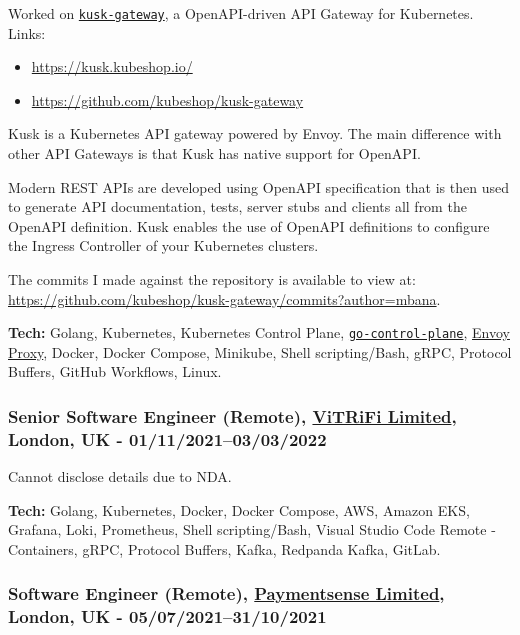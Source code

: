 \documentclass[
  a4paper,
  8pt,
]{article}
\providecommand{\tightlist}{%
  \setlength{\itemsep}{0pt}\setlength{\parskip}{0pt}}
\begin{document}
\begin{multicols}{2}
Worked on \href{https://docs.kusk.io/}{\texttt{kusk-gateway}}, a
OpenAPI-driven API Gateway for Kubernetes. Links:

\begin{itemize}
\tightlist
\item
  \url{https://kusk.kubeshop.io/}
\item
  \url{https://github.com/kubeshop/kusk-gateway}
\end{itemize}

Kusk is a Kubernetes API gateway powered by Envoy. The main difference
with other API Gateways is that Kusk has native support for OpenAPI.

Modern REST APIs are developed using OpenAPI specification that is then
used to generate API documentation, tests, server stubs and clients all
from the OpenAPI definition. Kusk enables the use of OpenAPI definitions
to configure the Ingress Controller of your Kubernetes clusters.

The commits I made against the repository is available to view at:
\url{https://github.com/kubeshop/kusk-gateway/commits?author=mbana}.

\textbf{Tech:} Golang, Kubernetes, Kubernetes Control Plane,
\href{https://github.com/envoyproxy/go-control-plane}{\texttt{go-control-plane}},
\href{https://www.envoyproxy.io/}{Envoy Proxy}, Docker, Docker Compose,
Minikube, Shell scripting/Bash, gRPC, Protocol Buffers, GitHub
Workflows, Linux.

\hypertarget{senior-software-engineer-remote-vitrifi-limited-london-uk---0111202103032022}{%
\subsubsection{\texorpdfstring{Senior Software Engineer (Remote),
\href{https://vitrifi.net}{ViTRiFi Limited}, London, UK -
01/11/2021--03/03/2022}{Senior Software Engineer (Remote), ViTRiFi Limited, London, UK - 01/11/2021--03/03/2022}}\label{senior-software-engineer-remote-vitrifi-limited-london-uk---0111202103032022}}

Cannot disclose details due to NDA.

\textbf{Tech:} Golang, Kubernetes, Docker, Docker Compose, AWS, Amazon
EKS, Grafana, Loki, Prometheus, Shell scripting/Bash, Visual Studio Code
Remote - Containers, gRPC, Protocol Buffers, Kafka, Redpanda Kafka,
GitLab.

\hypertarget{software-engineer-remote-paymentsense-limited-london-uk---0507202131102021}{%
\subsubsection{\texorpdfstring{Software Engineer (Remote),
\href{https://www.paymentsense.com}{Paymentsense Limited}, London, UK -
05/07/2021--31/10/2021}{Software Engineer (Remote), Paymentsense Limited, London, UK - 05/07/2021--31/10/2021}}\label{software-engineer-remote-paymentsense-limited-london-uk---0507202131102021}}


\end{multicols}
\end{document}
